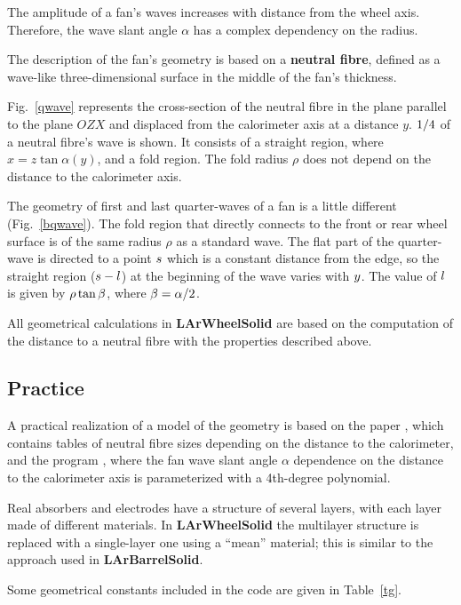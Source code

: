 \documentclass{article}
\begin{document}
The amplitude of a fan's waves increases with distance from the wheel axis.
Therefore, the wave slant angle $\alpha$ has a complex dependency on the radius.



The description of the fan's geometry is based on a {\bf neutral
fibre}, defined as a wave-like three-dimensional surface in the middle
of the fan's thickness.

Fig.~\ref{qwave} represents the cross-section of the neutral fibre in the
plane parallel to the plane $OZX$ and displaced from the calorimeter axis
at a distance $y$. $1/4\/$ of a neutral fibre's wave is shown. 
It consists of a straight region, where $x = z \tan \alpha(y)$, and a fold
region. The fold radius $\rho$ does not depend on the distance to the
calorimeter axis.



The geometry of first and last quarter-waves of a fan is a little different
(Fig.~\ref{bqwave}). The fold region that directly connects to the front or rear
wheel surface is of the same radius $\rho$ as a standard wave.
The flat part of the quarter-wave is directed to a point $s\/$ which
is a constant distance from the edge,
so the straight region ($s - l\/$) at the
beginning of the wave varies with $y\/$. The value of $l\/$ is given
by $\rho
\tan \beta\/$, where $\beta = \alpha / 2\/$.

All geometrical calculations in {\bf LArWheelSolid} are based on the
computation of the distance to a neutral fibre with the properties described
above.

\subsection{Practice}
A practical realization of a model of the geometry is based on the paper
\cite{geom_tables}, which  contains tables of neutral fibre sizes depending 
on the
distance to the calorimeter, and
the program \cite{simion}, where the fan wave slant angle $\alpha$ dependence
on the distance to the calorimeter axis is parameterized with a 4th-degree
polynomial.

Real absorbers and electrodes have a structure of several layers, with each
layer made of different materials. In {\bf LArWheelSolid} the multilayer
structure is replaced with a single-layer one using a ``mean'' material;
this is similar to the approach used in {\bf LArBarrelSolid}.

Some geometrical constants included in the code are given in Table~\ref{tg}.
\end{document}
